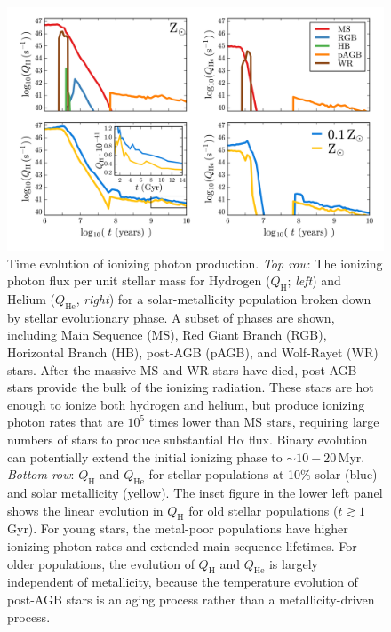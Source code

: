 \documentclass[preprint2]{aastex62}
\newcommand{\ha}{\ensuremath{\mathrm{H\alpha}}\xspace}
\newcommand{\QH}{\ensuremath{Q_{\mathrm{H}}}\xspace}
\newcommand{\QHe}{\ensuremath{Q_{\mathrm{He}}}\xspace}
\newcommand{\Myr}{$\,$Myr\xspace}
\begin{document}
\begin{figure}[ht]
  \begin{center}
    \includegraphics[width=\linewidth]{figs/f3.png}
    \caption{{\sc Time evolution of ionizing photon production.} \emph{Top row}: The ionizing photon flux per unit stellar mass for Hydrogen (\QH; \emph{left}) and Helium (\QHe, \emph{right}) for a solar-metallicity population broken down by stellar evolutionary phase. A subset of phases are shown, including Main Sequence (MS), Red Giant Branch (RGB), Horizontal Branch (HB), post-AGB (pAGB), and Wolf-Rayet (WR) stars. After the massive MS and WR stars have died, post-AGB stars provide the bulk of the ionizing radiation. These stars are hot enough to ionize both hydrogen and helium, but produce ionizing photon rates that are $10^5$ times lower than MS stars, requiring large numbers of stars to produce substantial \ha flux. Binary evolution can potentially extend the initial ionizing phase to $\sim10-20$\Myr. \emph{Bottom row}: \QH and \QHe for stellar populations at 10\% solar (blue) and solar metallicity (yellow). The inset figure in the lower left panel shows the linear evolution in \QH for old stellar populations ($t \gtrsim 1$ Gyr). For young stars, the metal-poor populations have higher ionizing photon rates and extended main-sequence lifetimes. For older populations, the evolution of \QH and \QHe is largely independent of metallicity, because the temperature evolution of post-AGB stars is an aging process rather than a metallicity-driven process.}
    \label{fig:QF}
  \end{center}
\end{figure}
\end{document}

